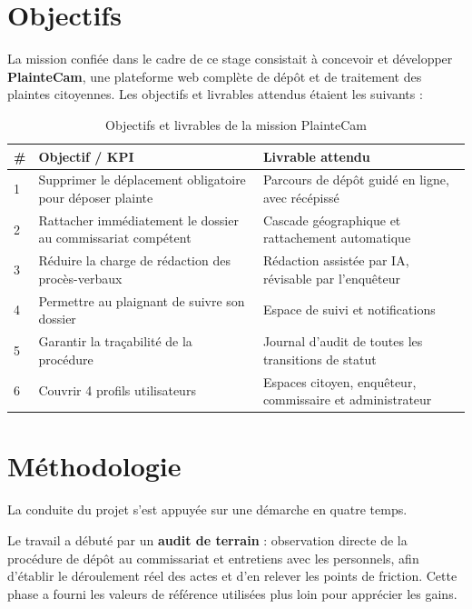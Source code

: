 \section*{Objectifs}

La mission confiée dans le cadre de ce stage consistait à concevoir et développer \textbf{PlainteCam}, une plateforme web complète de dépôt et de traitement des plaintes citoyennes. Les objectifs et livrables attendus étaient les suivants :

\begin{table}[H]
    \centering
    \begin{tabularx}{\textwidth}{|l|>{\raggedright\arraybackslash}X|>{\raggedright\arraybackslash}X|}
        \hline
        \textbf{\#} & \textbf{Objectif / KPI} & \textbf{Livrable attendu} \\
        \hline
        1 & Supprimer le déplacement obligatoire pour déposer plainte & Parcours de dépôt guidé en ligne, avec récépissé \\
        \hline
        2 & Rattacher immédiatement le dossier au commissariat compétent & Cascade géographique et rattachement automatique \\
        \hline
        3 & Réduire la charge de rédaction des procès-verbaux & Rédaction assistée par IA, révisable par l'enquêteur \\
        \hline
        4 & Permettre au plaignant de suivre son dossier & Espace de suivi et notifications \\
        \hline
        5 & Garantir la traçabilité de la procédure & Journal d'audit de toutes les transitions de statut \\
        \hline
        6 & Couvrir 4 profils utilisateurs & Espaces citoyen, enquêteur, commissaire et administrateur \\
        \hline
    \end{tabularx}
    \caption{Objectifs et livrables de la mission PlainteCam}
    \label{tab:objectifs}
\end{table}

\section*{Méthodologie}

La conduite du projet s'est appuyée sur une démarche en quatre temps.

Le travail a débuté par un \textbf{audit de terrain} : observation directe de la procédure de dépôt au commissariat et entretiens avec les personnels, afin d'établir le déroulement réel des actes et d'en relever les points de friction. Cette phase a fourni les valeurs de référence utilisées plus loin pour apprécier les gains.

